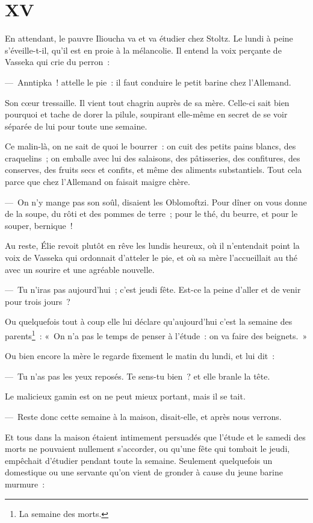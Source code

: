 \documentclass[french,twoside]{book} %
\begin{document}
\section[{XV}]{XV}\renewcommand{\leftmark}{XV}

\noindent En attendant, le pauvre Ilioucha va et va étudier chez Stoltz. Le lundi à peine s’éveille-t-il, qu’il est en proie à la mélancolie. Il entend la voix perçante de Vasseka qui crie du perron :\par
— Anntipka ! attelle le pie : il faut conduire le petit barine chez l’Allemand.\par
Son cœur tressaille. Il vient tout chagrin auprès de sa mère. Celle-ci sait bien pourquoi et tache de dorer la pilule, soupirant elle-même en secret de se voir séparée de lui pour toute une semaine.\par
Ce malin-là, on ne sait de quoi le bourrer : on cuit des petits pains blancs, des craquelins ; on emballe avec lui des salaisons, des pâtisseries, des confitures, des conserves, des fruits secs et confits, et même des aliments substantiels. Tout cela parce que chez l’Allemand on faisait maigre chère.\par
— On n’y mange pas son soûl, disaient les Oblomoftzi. Pour dîner on vous donne de la soupe, du rôti et des pommes de terre ; pour le thé, du beurre, et pour le souper, bernique !\par
Au reste, Élie revoit plutôt en rêve les lundis heureux, où il n’entendait point la voix de Vasseka qui ordonnait d’atteler le pie, et où sa mère l’accueillait au thé avec un sourire et une agréable nouvelle.\par
— Tu n’iras pas aujourd’hui ; c’est jeudi fête. Est-ce la peine d’aller et de venir pour trois jours ?\par
Ou quelquefois tout à coup elle lui déclare qu’aujourd’hui c’est la semaine des parents\footnote{La semaine des morts.} : « On n’a pas le temps de penser à l’étude : on va faire des beignets. »\par
Ou bien encore la mère le regarde fixement le matin du lundi, et lui dit :\par
— Tu n’as pas les yeux reposés. Te sens-tu bien ? et elle branle la tête.\par
Le malicieux gamin est on ne peut mieux portant, mais il se tait.\par
— Reste donc cette semaine à la maison, disait-elle, et après nous verrons.\par
Et tous dans la maison étaient intimement persuadés que l’étude et le samedi des morts ne pouvaient nullement s’accorder, ou qu’une fête qui tombait le jeudi, empêchait d’étudier pendant toute la semaine. Seulement quelquefois un domestique ou une servante qu’on vient de gronder à cause du jeune barine murmure :\par
\end{document}
